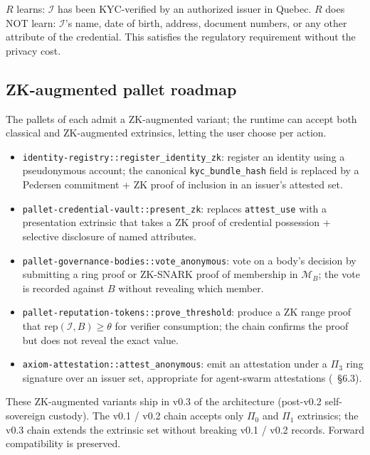 \documentclass[11pt,a4paper,parskip=half-,DIV=12,headings=standardclasses]{scrartcl}
\theoremstyle{ncthm}
\theoremstyle{ncdef}
\newcommand{\identity}{\mathcal{I}}
\begin{document}
$R$ learns: $\identity$ has been KYC-verified by an authorized
issuer in Quebec. $R$ does NOT learn: $\identity$'s name, date of
birth, address, document numbers, or any other attribute of the
credential. This satisfies the regulatory requirement without the
privacy cost.

\subsection{ZK-augmented pallet roadmap}

The pallets of  each admit a
ZK-augmented variant; the runtime can accept both classical and
ZK-augmented extrinsics, letting the user choose per action.

\begin{itemize}
\item \texttt{identity-registry::register\_identity\_zk}: register an
  identity using a pseudonymous account; the canonical
  \texttt{kyc\_bundle\_hash} field is replaced by a Pedersen
  commitment + ZK proof of inclusion in an issuer's attested set.
\item \texttt{pallet-credential-vault::present\_zk}: replaces
  \texttt{attest\_use} with a presentation extrinsic that takes a ZK
  proof of credential possession + selective disclosure of named
  attributes.
\item \texttt{pallet-governance-bodies::vote\_anonymous}: vote on a
  body's decision by submitting a ring proof or ZK-SNARK proof of
  membership in $\mathcal{M}_B$; the vote is recorded against $B$
  without revealing which member.
\item \texttt{pallet-reputation-tokens::prove\_threshold}: produce a
  ZK range proof that
  $\mathrm{rep}(\identity, B) \geq \theta$ for verifier consumption;
  the chain confirms the proof but does not reveal the exact value.
\item \texttt{axiom-attestation::attest\_anonymous}: emit an
  attestation under a $\Pi_3$ ring signature over an issuer set,
  appropriate for agent-swarm attestations
  (~\S6.3).
\end{itemize}

These ZK-augmented variants ship in v0.3 of the architecture
(post-v0.2 self-sovereign custody). The v0.1 / v0.2 chain accepts
only $\Pi_0$ and $\Pi_1$ extrinsics; the v0.3 chain extends the
extrinsic set without breaking v0.1 / v0.2 records. Forward
compatibility is preserved.

\end{document}
